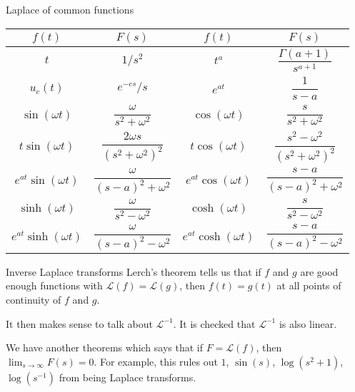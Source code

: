\documentclass[dvipsnames]{beamer}
\theoremstyle{definition}
\begin{document}
\begin{frame}{Laplace of common functions}
  \begin{center}
  \bgroup
  \def\arraystretch{2}
  \begin{tabular}{|c|c||c|c|} 
  \hline
  $f(t)$ & $F(s)$ & $f(t)$ & $F(s)$ \\
  \hline
  \hline
  $t$ & $1/s^2$ & $t^a$ & $\dfrac{\Gamma(a + 1)}{s^{a + 1}}$\\
  $u_c(t)$ & $e^{-cs}/s$ & $e^{at}$ & $\dfrac{1}{s - a}$\\
  $\sin(\omega t)$ & $\dfrac{\omega}{s^2 + \omega^2}$ & $\cos(\omega t)$ & $\dfrac{s}{s^2 + \omega^2}$\\
  $t\sin(\omega t)$ & $\dfrac{2\omega s}{(s^2 + \omega^2)^2}$ & $t\cos(\omega t)$ & $\dfrac{s^2 - \omega^2}{(s^2 + \omega^2)^2}$\\
  $e^{at}\sin(\omega t)$ & $\dfrac{\omega}{(s - a)^2 + \omega^2}$ & $e^{at}\cos(\omega t)$ & $\dfrac{s - a}{(s - a)^2 + \omega^2}$\\
  $\sinh(\omega t)$ & $\dfrac{\omega}{s^2 - \omega^2}$ & $\cosh(\omega t)$ & $\dfrac{s}{s^2 - \omega^2}$\\
  $e^{at}\sinh(\omega t)$ & $\dfrac{\omega}{(s - a)^2 - \omega^2}$ & $e^{at}\cosh(\omega t)$ & $\dfrac{s - a}{(s - a)^2 - \omega^2}$\\
  \hline
  \end{tabular}
  \egroup
\end{center}
\end{frame}
\begin{frame}{Inverse Laplace transforms}
  Lerch's theorem tells us that if $f$ and $g$ are good enough functions with $\mathcal{L}(f) = \mathcal{L}(g)$, \pause then $f(t) = g(t)$ at all points of continuity of $f$ and $g$. \pause

  It then makes sense to talk about $\mathcal{L}^{-1}$. \pause It is checked that $\mathcal{L}^{-1}$ is also linear. \pause

  We have another theorems which says that if $F = \mathcal{L}(f)$, then $\lim_{s \to \infty} F(s) = 0$. \pause For example, this rules out $1$, $\sin(s)$, $\log(s^{2} + 1)$, $\log(s^{-1})$ from being Laplace transforms.
\end{frame}
\end{document}
